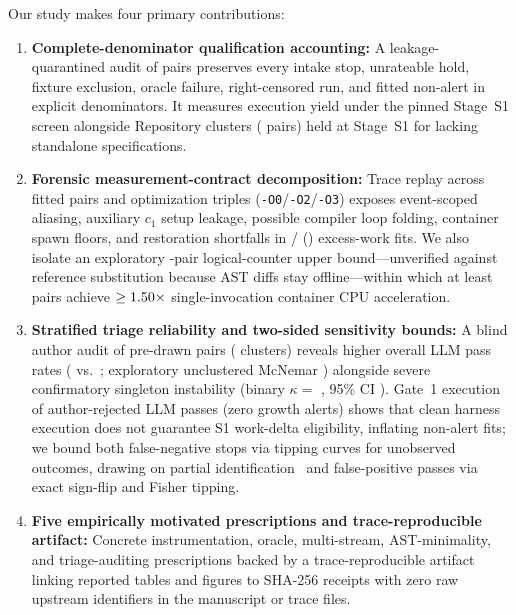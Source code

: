 \documentclass[11pt]{article}
\begin{document}
Our study makes four primary contributions:
\begin{enumerate}
\item \textbf{Complete-denominator qualification accounting:} A leakage-quarantined audit of \BenchPairs{} pairs preserves every intake stop, unrateable hold, fixture exclusion, oracle failure, right-censored run, and fitted non-alert in explicit denominators. It measures \BenchExecRate{} execution yield under the pinned Stage~S1 screen alongside \BenchConfRepoClustersN{} Repository clusters (\BenchConfRepoPairsN{} pairs) held at Stage~S1 for lacking standalone specifications.
\item \textbf{Forensic measurement-contract decomposition:} Trace replay across \BenchFittedClusters{} fitted pairs and \BenchOZeroAgree{} optimization triples (\texttt{-O0}/\texttt{-O2}/\texttt{-O3}) exposes event-scoped aliasing, auxiliary $c_1$ setup leakage, possible compiler loop folding, container spawn floors, and restoration shortfalls in \BenchRestFitFailN{}/\BenchRestFitExcessN{} (\BenchRestFitFailPct{}) excess-work fits. We also isolate an exploratory \BenchCoreFourN{}-pair logical-counter upper bound---unverified against reference substitution because AST diffs stay offline---within which at least \BenchRealizedCpuCoreN{} pairs achieve $\ge 1.50{}\times$ single-invocation container CPU acceleration.
\item \textbf{Stratified triage reliability and two-sided sensitivity bounds:} A blind author audit of \BenchAuthorSample{} pre-drawn pairs (\BenchAuthTotalClustersN{} clusters) reveals higher overall LLM pass rates (\BenchAuthLLMPassFrac{} vs.\ \BenchAuthAuthorPassFrac{}; exploratory unclustered McNemar \BenchAuthMcNemarP{}) alongside severe confirmatory singleton instability (binary $\kappa =$ \BenchAuthConfBinK{}, 95\% CI \BenchAuthConfBinKCI{}). Gate~1 execution of \BenchAuthRejExec{} author-rejected LLM passes (zero growth alerts) shows that clean harness execution does not guarantee S1 work-delta eligibility, inflating non-alert fits; we bound both false-negative stops via tipping curves for unobserved outcomes, drawing on partial identification~\cite{manski1990nonparametric} and false-positive passes via exact sign-flip and Fisher tipping.
\item \textbf{Five empirically motivated prescriptions and trace-reproducible artifact:} Concrete instrumentation, oracle, multi-stream, AST-minimality, and triage-auditing prescriptions backed by a trace-reproducible artifact linking reported tables and figures to SHA-256 receipts with zero raw upstream identifiers in the manuscript or trace files.
\end{enumerate}
\end{document}
